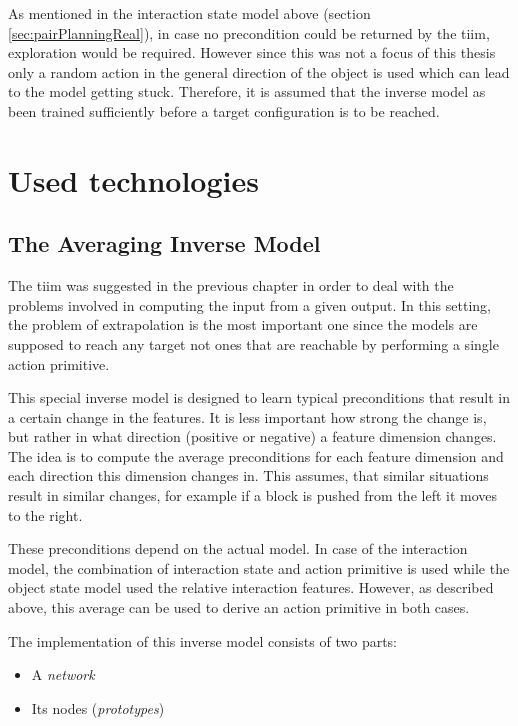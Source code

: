 As mentioned in the interaction state model above (section \ref{sec:pairPlanningReal}), in case no precondition could be returned by the \gls{tiim}, exploration would be required. However since this was not a focus of this thesis only a random action in the general direction of the object is used which
can lead to the model getting stuck. Therefore, it is assumed that the inverse model as been trained sufficiently before a target configuration is to be reached.

\section{Used technologies \label{sec:technologies}}

\subsection{The Averaging Inverse Model \label{sec:invModelRealization}} 

The \acrfull{tiim} was suggested in the previous chapter in order to deal with the problems involved in computing the input from a given output. In this setting, the problem of extrapolation is the most important one since the models are supposed to reach any target not ones that are reachable by performing a single action primitive.

This special inverse model is designed to learn typical preconditions that result in a certain change in the features. It is less important how strong the change is, but rather in what direction (positive or negative) a feature dimension changes. The idea is to compute the average preconditions for each feature dimension and each direction this dimension changes in. This assumes, that similar situations result in similar changes, for example if a block is pushed from the left it moves to the right.
 
These preconditions depend on the actual model. In case of the interaction model, the combination of interaction state and action primitive is used while the object state model used the relative interaction features. However, as described above, this average can be used to derive an action primitive in both cases.

The implementation of this inverse model consists of two parts: 
\begin{itemize}
\item A \textit{network}
\item Its nodes (\textit{prototypes})
\end{itemize}

